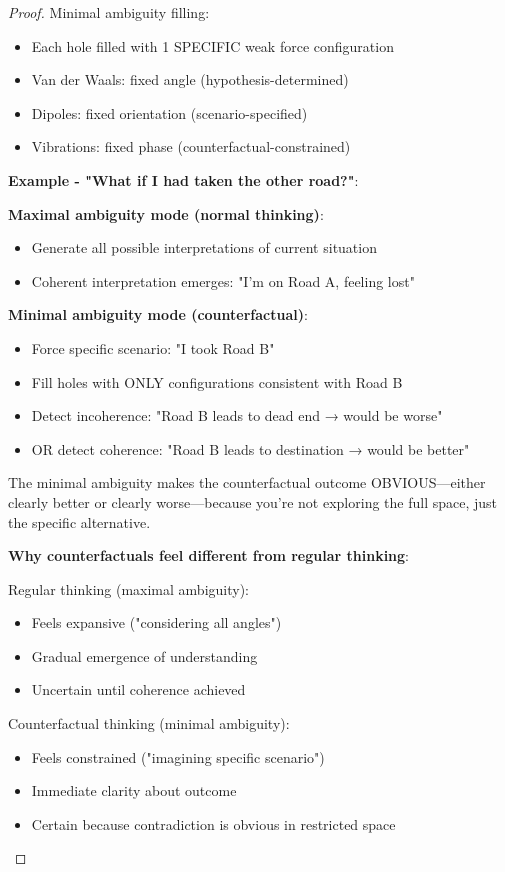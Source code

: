\documentclass[11pt,a4paper]{article}
\begin{document}
\begin{proof}
Minimal ambiguity filling:
\begin{itemize}
\item Each hole filled with 1 SPECIFIC weak force configuration
\item Van der Waals: fixed angle (hypothesis-determined)
\item Dipoles: fixed orientation (scenario-specified)
\item Vibrations: fixed phase (counterfactual-constrained)
\end{itemize}

\textbf{Example - "What if I had taken the other road?"}:

\textbf{Maximal ambiguity mode (normal thinking)}:
\begin{itemize}
\item Generate all possible interpretations of current situation
\item Coherent interpretation emerges: "I'm on Road A, feeling lost"
\end{itemize}

\textbf{Minimal ambiguity mode (counterfactual)}:
\begin{itemize}
\item Force specific scenario: "I took Road B"
\item Fill holes with ONLY configurations consistent with Road B
\item Detect incoherence: "Road B leads to dead end → would be worse"
\item OR detect coherence: "Road B leads to destination → would be better"
\end{itemize}

The minimal ambiguity makes the counterfactual outcome OBVIOUS—either clearly better or clearly worse—because you're not exploring the full space, just the specific alternative.

\textbf{Why counterfactuals feel different from regular thinking}:

Regular thinking (maximal ambiguity):
\begin{itemize}
\item Feels expansive ("considering all angles")
\item Gradual emergence of understanding
\item Uncertain until coherence achieved
\end{itemize}

Counterfactual thinking (minimal ambiguity):
\begin{itemize}
\item Feels constrained ("imagining specific scenario")
\item Immediate clarity about outcome
\item Certain because contradiction is obvious in restricted space
\end{itemize}


\end{proof}
\end{document}
